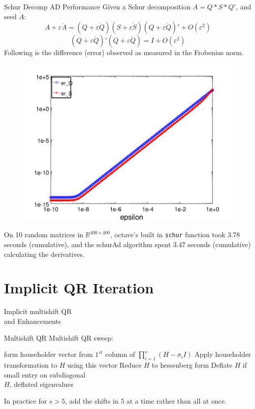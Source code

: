 \documentclass[12pt]{beamer}
\renewcommand{\d}[1]{\dot{#1}}
\newcommand{\e}{\varepsilon}
\begin{document}
  \begin{frame}{Schur Decomp AD Performance}
    Given a Schur decomposition $A = Q*S*Q'$, and seed $\d{A}$: 
    \[A + \e\d{A} = (Q + \e \d{Q})(S + \e \d{S})(Q + \e \d{Q})' + O(\e^2)\]
    \[ (Q + \e \d{Q})'(Q + \e \d{Q}) = I + O(\e^2)\]
    Following is the difference (error) observed as measured in the Frobenius norm.
    \begin{figure}[h!]
      \centering
      \includegraphics[width = .3\textwidth]{schurErr}
    \end{figure}
    On 10 random matrices in $\mathbb{R}^{400 \times 400}$, octave's built in \texttt{schur} function took 3.78 seconds (cumulative),
    and the schurAd algorithm spent 3.47 seconds (cumulative) calculating the derivatives.
  \end{frame}

	\section{Implicit QR Iteration}
	\begin{frame}{}
	  \centering
    {\huge Implicit multishift QR \\and Enhancements}
	\end{frame}

  \begin{frame}{Multishift QR}
    Multishift QR sweep:
    \begin{algorithmic}
        \State form householder vector from $1^{st}$ column of $\prod_{i=1}^{s}(H - \sigma_i I)$
        \State Apply householder transformation to $H$ using this vector
        \State Reduce $H$ to hessenberg form
        \State Deflate $H$ if small entry on subdiagonal\\
        \Return $H$, deflated eigenvalues
      \EndFunction
    \end{algorithmic}
    In practice for $s > 5$, add the shifts in $5$ at a time rather than all at once.
  \end{frame}
\end{document}
